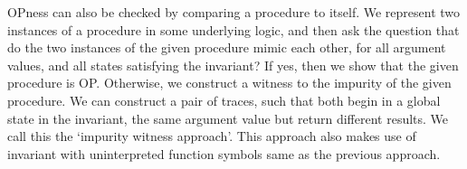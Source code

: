 \documentclass{llncs}
\begin{document}

OPness can also be checked by comparing a procedure to itself. We
represent two instances of a procedure in some underlying logic, and
then ask the question that do the two instances of the given procedure
mimic each other, for all argument values, and all states satisfying
the invariant? If yes, then we show that the given procedure is
OP. Otherwise, we construct a witness to the impurity of the given
procedure. We can construct a pair of traces, such that both begin in
a global state in the invariant, the same argument value but return
different results. We call this the `impurity witness approach'.
This approach also makes use of  invariant with uninterpreted function
symbols same as the previous approach.



\end{document}
